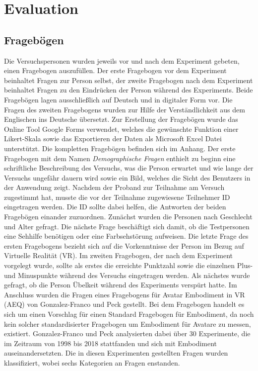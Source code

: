 \chapter{Evaluation}

\section{Fragebögen}
Die Versuchspersonen wurden jeweils vor und nach dem Experiment gebeten, einen Fragebogen auszufüllen. Der erste Fragebogen vor dem Experiment beinhaltet Fragen zur Person selbst, der zweite Fragebogen nach dem Experiment beinhaltet Fragen zu den Eindrücken der Person während des Experiments. Beide Fragebögen lagen ausschließlich auf Deutsch und in digitaler Form vor. Die Fragen des zweiten Fragebogens wurden zur Hilfe der Verständlichkeit aus dem Englischen ins Deutsche übersetzt. Zur Erstellung der Fragebögen wurde das Online Tool Google Forms verwendet, welches die gewünschte Funktion einer Likert-Skala sowie das Exportieren der Daten als Microsoft Excel Datei unterstützt. Die kompletten Fragebögen befinden sich im Anhang.
Der erste Fragebogen mit dem Namen \textit{Demographische Fragen} enthielt zu beginn eine schriftliche Beschreibung des Versuchs, was die Person erwartet und wie lange der Versuchs ungefähr dauern wird sowie ein Bild, welches die Sicht des Benutzers in der Anwendung zeigt. Nachdem der Proband zur Teilnahme am Versuch zugestimmt hat, musste die vor der Teilnahme zugewiesene Teilnehmer ID eingetragen werden. Die ID sollte dabei helfen, die Antworten der beiden Fragebögen einander zuzuordnen. Zunächst wurden die Personen nach Geschlecht und Alter gefragt. Die nächste Frage beschäftigt sich damit, ob die Testpersonen eine Sehhilfe benötigen oder eine Farbsehstörung aufweisen. Die letzte Frage des ersten Fragebogens bezieht sich auf die Vorkenntnisse der Person im Bezug auf Virtuelle Realität (VR). 
Im zweiten Fragebogen, der nach dem Experiment vorgelegt wurde, sollte als erstes die erreichte Punktzahl sowie die einzelnen Plus- und Minuspunkte während des Versuchs eingetragen werden. Als nächstes wurde gefragt, ob die Person Übelkeit während des Experiments verspürt hatte.
Im Anschluss wurden die Fragen eines Fragebogens für Avatar Embodiment in VR (AEQ) von Gonzalez-Franco und Peck \cite{Gonzalez-Franco2018} gestellt. Bei dem Fragebogen handelt es sich um einen Vorschlag für einen Standard Fragebogen für Embodiment, da noch kein solcher standardisierter Fragebogen um Embodiment für Avatare zu messen, existiert. Gonzalez-Franco und Peck analysierten dabei über 30 Experimente, die im Zeitraum von 1998 bis 2018 stattfanden und sich mit Embodiment auseinandersetzten. Die in diesen Experimenten gestellten Fragen wurden klassifiziert, wobei sechs Kategorien an Fragen enstanden.
